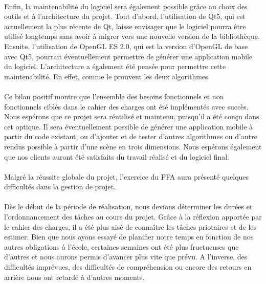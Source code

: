 \paragraph{}
Enfin, la maintenabilité du logiciel sera également possible grâce au choix des outils et à l'architecture du projet. 
Tout d'abord, l'utilisation de Qt5, qui est actuellement la plus récente de Qt, laisse envisager que le logiciel pourra être utilisé longtemps sans avoir à migrer vers une nouvelle version de la bibliothèque. Ensuite, l'utilisation de OpenGL ES 2.0, qui est la version d'OpenGL de base avec Qt5, pourrait éventuellement permettre de générer une application mobile du logiciel. 
L'architecture a également été pensée pour permettre cette maintenabilité. En effet, comme le prouvent les deux algorithmes 

\paragraph{}
Ce bilan positif montre que l'ensemble des besoins fonctionnels et non fonctionnels ciblés dans le cahier des charges ont été implémentés avec succès. Nous espérons que ce projet sera réutilisé et maintenu, puisqu'il a été conçu dans cet optique. Il sera éventuellement possible de générer une application mobile à partir du code existant, ou d'ajouter et de tester d'autres algorithmes ou d'autre rendus possible à partir d'une scène en trois dimensions. Nous espérons également que nos clients auront été satisfaits du travail réalisé et du logiciel final. 

\paragraph{}
Malgré la réussite globale du projet, l'exercice du PFA aura présenté quelques difficultés dans la gestion de projet.

\paragraph{}
Dès le début de la période de réalisation, nous devions déterminer les durées et l'ordonnancement des tâches au cours du projet. Grâce à la réflexion apportée par le cahier des charges, il a été plus aisé de connaître les tâches priotaires et de les estimer. Bien que nous ayons essayé de planifier notre temps en fonction de nos autres obligations à l'école, certaines semaines ont été plus fructueuses que d'autres et nous aurons permis d'avancer plus vite que prévu. A l'inverse, des difficultés imprévues, des difficultés de compréhension ou encore des retours en arrière nous ont retardé à d'autres moments.

